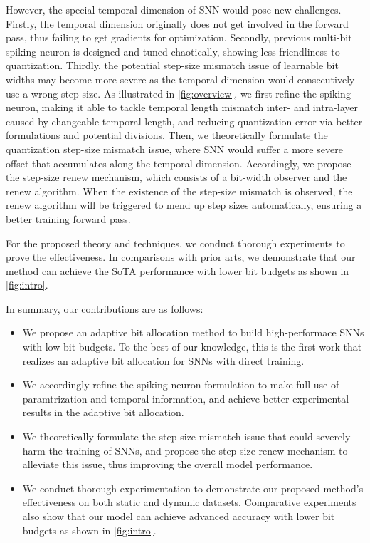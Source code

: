 However, the special temporal dimension of SNN would pose new challenges. Firstly, the temporal dimension originally does not get involved in the forward pass, thus 
failing to get gradients for optimization. 
Secondly, previous multi-bit spiking neuron is designed and tuned chaotically, showing less friendliness to quantization. Thirdly, the potential step-size mismatch issue of learnable bit widths may become more severe as the temporal dimension
would consecutively use a wrong step size.
As illustrated in  \cref{fig:overview}, we first refine the spiking neuron, making it able to tackle temporal length mismatch inter- and intra-layer caused by changeable temporal length, and reducing quantization error via better formulations and potential divisions.
Then, we theoretically formulate the quantization step-size mismatch issue, where SNN would suffer a more severe offset that accumulates along the temporal dimension. Accordingly,
we propose the step-size renew mechanism, which consists of a bit-width observer and the renew algorithm. When the existence of the step-size mismatch is observed, the renew algorithm will be triggered to mend up step sizes automatically, ensuring a better training forward pass.


For the proposed theory and techniques, we conduct thorough experiments to prove the effectiveness. In comparisons with prior arts, we demonstrate that our method can achieve the SoTA performance with lower bit budgets as shown in  \cref{fig:intro}.

In summary, our contributions are as follows:

\begin{itemize}
    \item We propose an adaptive bit allocation method to build high-performace SNNs with low bit budgets. To the best of our knowledge, this is the first work that realizes an adaptive bit allocation for SNNs with direct training. 
    \item We accordingly refine the spiking neuron formulation to make full use of paramtrization and temporal information, and achieve better experimental results in the adaptive bit allocation.
    \item We theoretically formulate the step-size mismatch issue that could severely harm the training of SNNs, and
    propose the step-size renew mechanism to alleviate this issue, thus improving the overall model performance.
    \item We conduct thorough experimentation to demonstrate our proposed method's 
    effectiveness on both static and dynamic datasets. Comparative experiments also show that our model can achieve advanced accuracy with lower bit budgets as shown in \cref{fig:intro}. 
\end{itemize}


